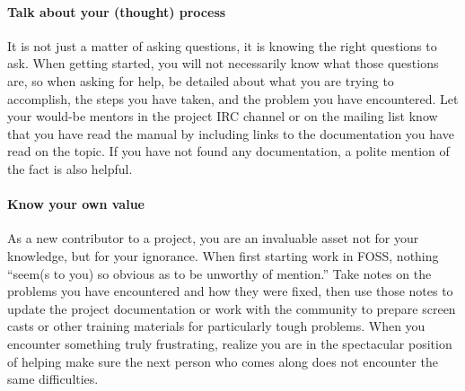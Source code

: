 \paragraph*{Talk about your (thought) process} It is not just a matter of asking
questions, it is knowing the right questions to ask. When getting started, you
will not necessarily know what those questions are, so when asking for help, be
detailed about what you are trying to accomplish, the steps you have taken, and
the problem you have encountered. Let your would-be mentors in the project IRC
channel or on the mailing list know that you have read the manual by including
links to the documentation you have read on the topic. If you have not found any
documentation, a polite mention of the fact is also helpful.

\paragraph*{Know your own value} As a new contributor to a project, you are an
invaluable asset not for your knowledge, but for your ignorance. When first
starting work in FOSS, nothing ``seem(s to you) so obvious as to be unworthy of
mention.'' Take notes on the problems you have encountered and how they were
fixed, then use those notes to update the project documentation or work with the
community to prepare screen casts or other training materials for particularly
tough problems. When you encounter something truly frustrating, realize you are
in the spectacular position of helping make sure the next person who comes along
does not encounter the same difficulties.
